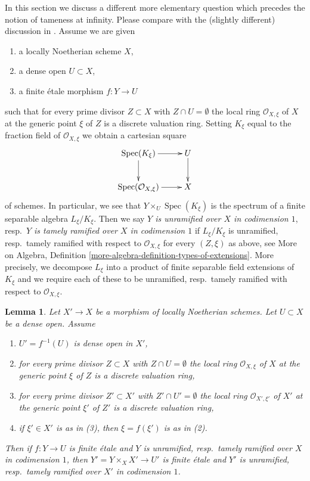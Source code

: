 \documentclass{stacks-project}
\theoremstyle{plain}
\newtheorem{lemma}[subsection]{Lemma}
\theoremstyle{definition}
\theoremstyle{remark}
\numberwithin{equation}{subsection}
\def\Spec{\mathop{\mathrm{Spec}}}
\begin{document}
\medskip\noindent
In this section we discuss a different more elementary question which
precedes the notion of tameness at infinity.
Please compare with the (slightly different)
discussion in \cite{Grothendieck-Murre}.
Assume we are given
\begin{enumerate}
\item a locally Noetherian scheme $X$,
\item a dense open $U \subset X$,
\item a finite \'etale morphism $f : Y \to U$
\end{enumerate}
such that for every prime divisor $Z \subset X$
with $Z \cap U = \emptyset$ the local ring $\mathcal{O}_{X, \xi}$
of $X$ at the generic point $\xi$ of $Z$ is a discrete valuation ring.
Setting $K_\xi$ equal to the fraction field of $\mathcal{O}_{X, \xi}$
we obtain a cartesian square
$$
\xymatrix{
\Spec(K_\xi) \ar[r] \ar[d] & U \ar[d] \\
\Spec(\mathcal{O}_{X, \xi}) \ar[r] & X
}
$$
of schemes. In particular, we see that $Y \times_U \Spec(K_\xi)$
is the spectrum of a finite separable algebra $L_\xi/K_\xi$.
Then we say
{\it $Y$ is unramified over $X$ in codimension $1$},
resp.\ {\it $Y$ is tamely ramified over $X$ in codimension $1$}
if $L_\xi/K_\xi$ is unramified, resp.\ tamely ramified
with respect to $\mathcal{O}_{X, \xi}$ for every $(Z, \xi)$
as above, see More on Algebra, Definition
\ref{more-algebra-definition-types-of-extensions}.
More precisely, we decompose $L_\xi$ into a product of finite
separable field extensions of $K_\xi$ and we require each of these
to be unramified, resp.\ tamely ramified with respect to
$\mathcal{O}_{X, \xi}$.

\begin{lemma}
\label{lemma-pullback-tame-codim1}
Let $X' \to X$ be a morphism of locally Noetherian schemes.
Let $U \subset X$ be a dense open. Assume
\begin{enumerate}
\item $U' = f^{-1}(U)$ is dense open in $X'$,
\item for every prime divisor $Z \subset X$ with $Z \cap U = \emptyset$
the local ring $\mathcal{O}_{X, \xi}$ of $X$ at the generic point $\xi$
of $Z$ is a discrete valuation ring,
\item for every prime divisor $Z' \subset X'$
with $Z' \cap U' = \emptyset$ the local ring $\mathcal{O}_{X', \xi'}$
of $X'$ at the generic point $\xi'$ of $Z'$ is a discrete valuation ring,
\item if $\xi' \in X'$ is as in (3), then $\xi = f(\xi')$ is as in (2).
\end{enumerate}
Then if $f : Y \to U$ is finite \'etale and
$Y$ is unramified, resp.\ tamely ramified over $X$
in codimension $1$, then $Y' = Y \times_X X' \to U'$ is finite \'etale
and $Y'$ is unramified, resp.\ tamely ramified over $X'$ in codimension $1$.
\end{lemma}
\end{document}
